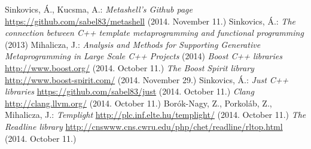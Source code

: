 \documentclass[a4paper,12pt]{report}
\begin{document}



\vspace*{\fill}
\begin{center}
\end{center}
\vfill
\thispagestyle{empty}
\newpage
\setcounter{page}{1}

\tableofcontents













\begin{thebibliography}{9}
    Sinkovics, Á., Kucsma, A.:
    \textit{Metashell's Github page}
    \url{https://github.com/sabel83/metashell} (2014. November 11.)
    Sinkovics, Á.:
    \textit{The connection between C++ template metaprogramming and functional
    programming} (2013)
    Mihalicza, J.:
    \textit{Analysis and Methods for Supporting Generative Metaprogramming in
    Large Scale C++ Projects} (2014)
    \textit{Boost C++ libraries}
    \url{http://www.boost.org/} (2014. October 11.)
    \textit{The Boost Spirit library}
    \url{http://www.boost-spirit.com/} (2014. November 29.)
    Sinkovics, Á.:
    \textit{Just C++ libraries}
    \url{https://github.com/sabel83/just} (2014. October 11.)
    \textit{Clang}
    \url{http://clang.llvm.org/} (2014. October 11.)
    Borók-Nagy, Z., Porkoláb, Z., Mihalicza, J.:
    \textit{Templight}
    \url{http://plc.inf.elte.hu/templight/} (2014. October 11.)
    \textit{The Readline library}
    \url{http://cnswww.cns.cwru.edu/php/chet/readline/rltop.html}
    (2014. October 11.)
\end{thebibliography}
\end{document}
